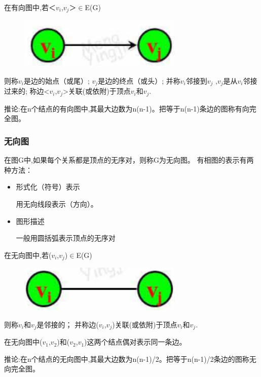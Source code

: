 \documentclass[AutoFakeBold]{LZUThesis2007}
\begin{document}
在有向图中,若＜$v_{i}$,$v_{j}$＞$\in$E(G)
\begin{figure}[H]
    \centering
    \includegraphics[width=0.7\textwidth]{figures/8.3.png}
    
    \label{fig_install_texlive}
\end{figure}
则称$v_{i}$是边的始点（或尾）; $v_{j}$是边的终点（或头）; 并称$v_{i}$邻接到$v_{j}$ ,$v_{j}$是从$v_{i}$邻接过来的; 称边<$v_{i}$,$v_{j}$>关联(或依附)于顶点$v_{i}$和$v_{j}$.

推论:在n个结点的有向图中,其最大边数为n(n-1)。把等于n(n-1)条边的图称有向完全图。

			\subsubsection{无向图}
在图G中,如果每个关系都是顶点的无序对，则称G为无向图。
有相图的表示有两种方法：
	\begin{itemize}
		\item 形式化（符号）表示
	
	用无向线段表示（方向）。
		\item 图形描述
	
	一般用圆括弧表示顶点的无序对
	\end{itemize}

在无向图中,若($v_{i}$,$v_{j}$)$\in$E(G)
\begin{figure}[H]
    \centering
    \includegraphics[width=0.7\textwidth]{figures/8.4.png}
    
    \label{fig_install_texlive}
\end{figure}
则称$v_{i}$和$v_{j}$是邻接的； 并称边($v_{i}$,$v_{j}$)关联(或依附)于顶点$v_{i}$和$v_{j}$.

在无向图中($v_{1}$,$v_{2}$)和($v_{2}$,$v_{1}$)这两个结点偶对表示同一条边。

推论:在n个结点的无向图中,其最大边数为n(n-1)/2。把等于n(n-1)/2条边的图称无向完全图。
\end{document}
